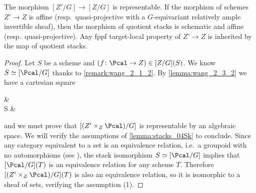             \begin{lemma}
                \label{lemma:wang_2_3_1}
                The morphism $[Z'/G] \to [Z/G]$ is representable. If the morphism of schemes $Z' \to Z$ is affine (resp.\ quasi-projective with a $G$-equivariant relatively ample invertible sheaf), then the morphism of quotient stacks is schematic and affine (resp.\ quasi-projective). Any fppf target-local property of $Z' \to Z$ is inherited by the map of quotient stacks.
            \end{lemma}
            \begin{proof}
                Let $S$ be a scheme and $(f\colon \Pcal \to Z) \in [Z/G](S)$. We know $S \simeq [\Pcal/G]$ thanks to \cref{remark:wang_2_1_2}. By \cref{lemma:wang_2_3_2} we have a cartesian square 
                \begin{diag}
                     \ar[d] \ar[r] & \left[ Z'/G \right] \ar[d] \\
                    S  & \left[ Z/G \right]
                \end{diag}
                and we must prove that $[(Z' \times_Z \Pcal)/G]$ is representable by an algebraic space. We will verify the assumptions of \cref{lemma:stacks_04Sk} to conclude.                
                Since any category equivalent to a set is an equivalence relation, i.e.\ a groupoid with no automorphisms (see \cite[3.5.3]{Vist:desc}), the stack isomorphism $S \simeq [\Pcal/G]$ implies that $[\Pcal/G](T)$ is an equivalence relation for any scheme $T$. Therefore $[(Z' \times_Z \Pcal)/G](T)$ is also an equivalence relation, so it is isomorphic to a sheaf of sets, verifying the assumption (1).
                

\end{proof}
